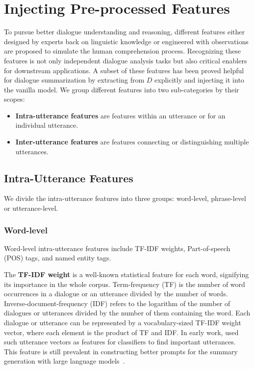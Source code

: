 \section{Injecting Pre-processed Features} 
\label{sec:feature}
To pursue better dialogue understanding and reasoning, different features either designed by experts back on linguistic knowledge or engineered with observations are proposed to simulate the human comprehension process.
Recognizing these features is not only independent dialogue analysis 
tasks but also critical enablers for downstream applications. 
A subset of these features has been proved helpful for dialogue summarization by extracting from $D$ explicitly and injecting it into the vanilla model.
We group different features into two sub-categories by their scopes:
\begin{itemize}
	\item \textbf{Intra-utterance features} are features within an utterance or for an individual utterance.
	\item \textbf{Inter-utterance features} are features connecting or distinguishing multiple utterances.
\end{itemize}



\subsection{Intra-Utterance Features}

We divide the intra-utterance features into three groups: word-level, 
phrase-level or utterance-level.


\subsubsection{Word-level}
Word-level intra-utterance features include TF-IDF weights, Part-of-speech (POS) tags, and named entity tags.

The \textbf{TF-IDF weight} is a well-known statistical feature for each word, signifying its importance in the whole corpus. 
Term-frequency (TF) is the number of word occurrences in a dialogue or an utterance divided by the number of words. Inverse-document-frequency (IDF) refers to the logarithm of the number of dialogues or utterances divided by the number of them containing the word.
Each dialogue or utterance can be represented by a vocabulary-sized TF-IDF weight vector, where each element is the product of TF and IDF. 
In early work, \citet{murray2005extractive} used such utterance vectors as features for classifiers to find important utterances.
This feature is still prevalent in constructing better prompts for the summary generation with large language models~\cite{prodan2021prompt}.


